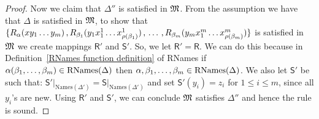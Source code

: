 \begin{proof}
\par Now we claim that $\Delta''$ is satisfied in $\mathfrak{M}$. From the assumption we have that $\Delta$ is satisfied in $\mathfrak{M}$, to show that $\{R_{\alpha}(xy_1 \ldots y_m) \text{\,,\,} R_{\beta_1}(y_1x_1^1 \ldots x_{\rho(\beta_1)}^1) \text{\,,\,} \ldots \text{\,,\,} R_{\beta_m}(y_m x_1^m \ldots x_{\rho(\beta_m)}^m)\}$ is satisfied in $\mathfrak{M}$ we create mappings $\mathsf{R}'$ and $\mathsf{S}'$. So, we let $\mathsf{R}'= \mathsf{R}$. We can do this because in Definition~\ref{RNames function definition} of RNames if $\alpha(\beta_1,\ldots,\beta_m)\in\text{RNames($\Delta$)}$ then $\alpha,\beta_1,\ldots,\beta_m\in\text{RNames($\Delta$)}$. We also let $\mathsf{S}'$ be such that: $\mathsf{S}'\rvert_{\text{Names}(\Delta')}= \mathsf{S}\rvert_{\text{Names}(\Delta')}$ and set $\mathsf{S}'(y_i) = z_i$ for $1\leq i \leq m$, since all $y_i$'s are new. Using $\mathsf{R}'$ and $\mathsf{S}'$, we can conclude $\mathfrak{M}$ satisfies $\Delta''$ and hence the rule is sound.




\end{proof}
